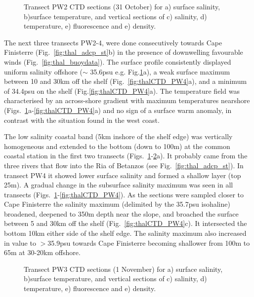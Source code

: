 \begin{figure}[t]
\arribacap \centering %
\hspace{0.2cm}
\quad%
\subfigure[]{\texttt{[image: PW1\_S]}}%
\subfigure[]{\texttt{[image: PW1\_T]}}\quad%
\subfigure[]{\texttt{[image: PW1\_F]}}%
\subfigure[]{\texttt{[image: PW1\_D]}}%
\caption{Transect PW2 CTD sections (31 October)  for a) surface
salinity, b)surface temperature, and vertical sections of c)
salinity, d) temperature, e) fluorescence and e) density.}
\label{fig:thalCTD_PW2}
\end{figure}

The next three transects PW2-4, were done consecutively towards
Cape Finisterre (Fig.~\ref{fig:thal_adcp_st}b) in the presence of
downwelling favourable winds (Fig.~\ref{fig:thal_buoydata}). The
surface profile consistently displayed uniform salinity offshore
($\sim$ 35.6psu e.g. Fig.\ref{fig:thalCTD_PW2}a), a weak surface
maximum between 10 and 30km off the shelf
(Fig.~\ref{fig:thalCTD_PW4}a), and a minimum of 34.4psu on the
shelf (Fig.\ref{fig:thalCTD_PW4}a). The temperature field was
characterised by an across-shore gradient with maximum
temperatures nearshore
(Figs.~\ref{fig:thalCTD_PW2}a-\ref{fig:thalCTD_PW4}a) and no sign
of a surface warm anomaly, in contrast with the situation found in
the west coast.

The low salinity coastal band (5km inshore of the shelf edge) was
vertically homogeneous and extended to the bottom (down to 100m)
at the common coastal station in the first two transects
(Figs.~\ref{fig:thalCTD_PW2}-\ref{fig:thalCTD_PW3}a). It probably
came from the three rivers that flow into the Ria of Betanzos (see
Fig.~\ref{fig:thal_adcp_st}). In transect PW4 it showed lower
surface salinity and formed a shallow layer (top 25m). A gradual
change in the subsurface salinity maximum was seen in all
transects (Figs.~\ref{fig:thalCTD_PW2}-\ref{fig:thalCTD_PW4}). As
the sections were sampled closer to Cape Finisterre the salinity
maximum (delimited by the 35.7psu isohaline) broadened, deepened
to 350m depth near the slope, and broached the surface between 5
and 30km off the shelf (Fig.~\ref{fig:thalCTD_PW4}c). It
intersected the bottom 10km either side of the shelf edge. The
salinity maximum also increased in value to $>$35.9psu towards
Cape Finisterre becoming shallower from 100m to 65m at 30-20km
offshore.

\begin{figure}[ht]
\arribacap \centering %
\hspace{0.1cm}
\quad%
\subfigure[]{\texttt{[image: PW2\_S]}}%
\subfigure[]{\texttt{[image: PW2\_T]}}\quad%
\subfigure[]{\texttt{[image: PW2\_F]}}%
\subfigure[]{\texttt{[image: PW2\_D]}}%
\caption{Transect PW3 CTD sections (1 November)  for a) surface
salinity, b)surface temperature, and vertical sections of c)
salinity, d) temperature, e) fluorescence and e) density.}
\label{fig:thalCTD_PW3}
\end{figure}
\FloatBarrier

